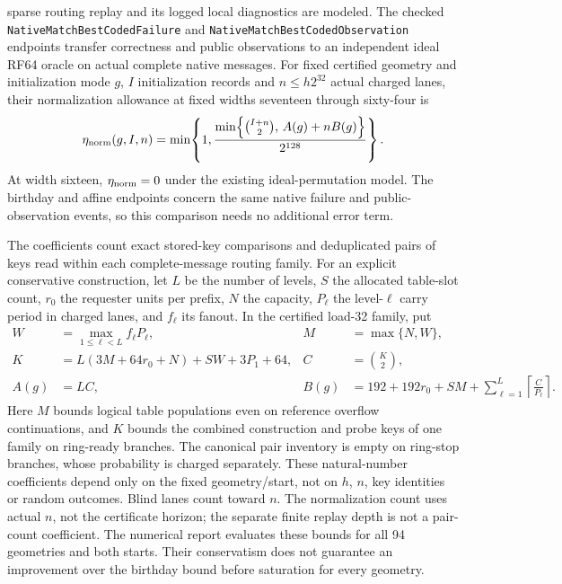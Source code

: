 \documentclass[11pt]{article}
\theoremstyle{definition}
\theoremstyle{remark}
\begin{document}
sparse routing replay and its logged local diagnostics are modeled.
The checked \texttt{NativeMatchBestCodedFailure} and
\texttt{NativeMatchBestCodedObservation} endpoints transfer correctness and
public observations to an independent ideal RF64 oracle on actual complete
native messages. For fixed certified geometry and initialization mode $g$,
$I$ initialization records and $n\le h2^{32}$ actual charged lanes, their
normalization allowance at fixed widths seventeen through sixty-four is
\[
 \eta_{\rm norm}(g,I,n)=\min\!\left\{1,
   \frac{\min\!\left\{\binom{I+n}{2},\,A(g)+nB(g)\right\}}{2^{128}}\right\}.
\]
At width sixteen, $\eta_{\rm norm}=0$ under the existing ideal-permutation
model. The birthday and affine endpoints concern the same native failure
and public-observation events, so this comparison needs no additional
error term.

The coefficients count exact stored-key comparisons and deduplicated pairs
of keys read within each complete-message routing family. For an explicit
conservative construction, let $L$ be the number of levels, $S$ the allocated
table-slot count, $r_0$ the requester units per prefix, $N$ the capacity,
$P_\ell$ the level-$\ell$ carry period in charged lanes, and $f_\ell$ its
fanout. In the certified load-32 family, put
\[
 \begin{aligned}
 W&=\max_{1\le\ell<L} f_\ell P_\ell,
 &M&=\max\{N,W\},\\
 K&=L(3M+64r_0+N)+SW+3P_1+64,
 &C&=\binom K2,\\
 A(g)&=LC,
 &B(g)&=192+192r_0+SM+\sum_{\ell=1}^{L}
     \left\lceil\frac{C}{P_\ell}\right\rceil.
 \end{aligned}
\]
Here $M$ bounds logical table populations even on reference overflow
continuations, and $K$ bounds the combined construction and probe keys of
one family on ring-ready branches. The canonical pair inventory is empty
on ring-stop branches, whose probability is charged separately. These
natural-number coefficients depend only on the fixed geometry/start, not on $h$, $n$, key identities or random outcomes. Blind
lanes count toward $n$. The normalization count uses actual $n$, not the
certificate horizon; the separate finite replay depth is not a pair-count
coefficient. The numerical report evaluates these bounds for all 94
geometries and both starts. Their conservatism does not guarantee an
improvement over the birthday bound before saturation for every geometry.
\end{document}
